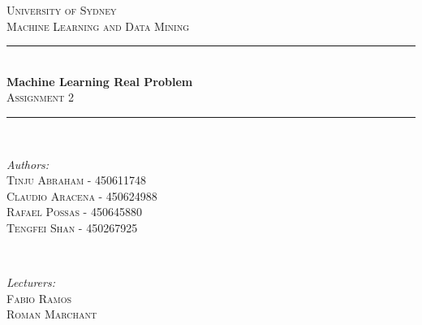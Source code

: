 \documentclass[letterpaper,10pt]{article}
\theoremstyle{mytheor}
\begin{document}
\begin{titlepage}

\newcommand{\HRule}{\rule{\linewidth}{0.5mm}} %

\center %
 

\textsc{\LARGE University of Sydney}\\[1.5cm] %

\textsc{\Large Machine Learning and Data Mining}\\[0.5cm] %


\HRule \\[0.4cm]
{ \huge \bfseries Machine Learning Real Problem}\\[0.4cm] %
\textsc{\Large Assignment 2}\\[0.5cm]
\HRule \\[1.5cm]
 

\begin{minipage}{0.4\textwidth}
\begin{flushleft} \large
\emph{Authors:}\\
\textsc{Tinju Abraham - 450611748\\		
		Claudio Aracena - 450624988\\
		Rafael Possas - 450645880\\
		Tengfei Shan - 450267925\\
} %
\end{flushleft}
\end{minipage}
~
\begin{minipage}{0.4\textwidth}
\begin{flushright} \large
\emph{Lecturers:} \\
 \textsc{Fabio Ramos\\
 		 Roman Marchant} %
\end{flushright}
\end{minipage}\\[4cm]


\end{titlepage}
\end{document}
